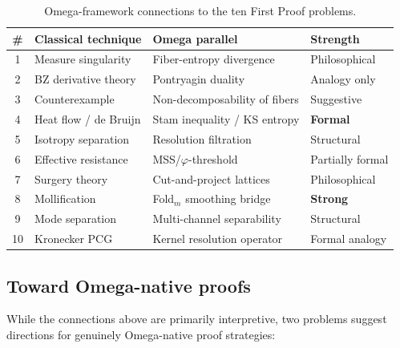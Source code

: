 \begin{table}[h]
\centering
\caption{Omega-framework connections to the ten First Proof problems.}
\label{tab:omega}
\smallskip
\begin{tabular}{@{}clll@{}}
\toprule
\textbf{\#} & \textbf{Classical technique} & \textbf{Omega parallel} & \textbf{Strength} \\
\midrule
1 & Measure singularity  & Fiber-entropy divergence      & Philosophical \\
2 & BZ derivative theory & Pontryagin duality            & Analogy only \\
3 & Counterexample       & Non-decomposability of fibers  & Suggestive \\
4 & Heat flow / de Bruijn & Stam inequality / KS entropy  & \textbf{Formal} \\
5 & Isotropy separation  & Resolution filtration          & Structural \\
6 & Effective resistance & MSS/$\varphi$-threshold         & Partially formal \\
7 & Surgery theory       & Cut-and-project lattices       & Philosophical \\
8 & Mollification        & Fold$_m$ smoothing bridge      & \textbf{Strong} \\
9 & Mode separation      & Multi-channel separability     & Structural \\
10& Kronecker PCG        & Kernel resolution operator     & Formal analogy \\
\bottomrule
\end{tabular}
\end{table}


\subsection{Toward Omega-native proofs}

While the connections above are primarily interpretive, two problems
suggest directions for genuinely Omega-native proof strategies:

